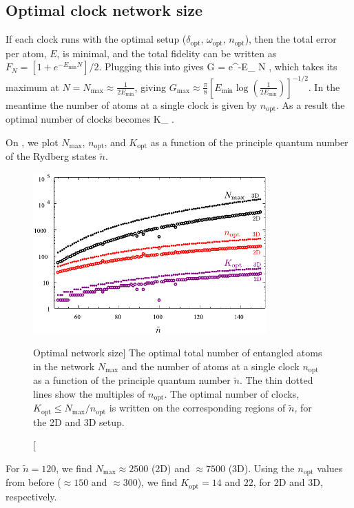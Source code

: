 \subsection{Optimal clock network size}
If each clock runs with the optimal setup ($\delta_\mathrm{opt},\,
\omega_\mathrm{opt},\, n_\mathrm{opt}$), then the total error per atom, $E$, is
minimal, and the total fidelity can be written as $F_N =
\left[1+e^{-E_\mathrm{min}N}\right]/2$. Plugging this into  gives
\bel
	G = e^{-E_ N} ,
\eel 
which takes its maximum at $N = N_\mathrm{max} \approx \frac{1}{2E_\mathrm{min}}$,
giving $G_\mathrm{max} \approx \frac{\pi}{8}
\left[E_\mathrm{min}\log\left(\frac{1}{2E_\mathrm{min}}\right)\right]^{-1/2}$.
In the meantime the number of atoms at a single clock is given by $ n_\mathrm{opt}$.
As a result the optimal number of clocks becomes 
\bel
	K_ \leq {} \approx
	.
\eel

On , we plot $N_{\mathrm{max}}$, $n_\mathrm{opt}$, and
$K_\mathrm{opt}$ as a function of the principle quantum number of the
Rydberg states $\tilde n$.
\begin{figure}[h]
\centering
\includegraphics[width=0.8\textwidth]{./figs_Komar2015/NnK_2d3d.pdf}
\caption
[Optimal network size]
{
\label{fig:K}
The optimal total number of entangled atoms in the network $N_\mathrm{max}$ and
the number of atoms at a single clock $n_\mathrm{opt}$ as a function of the principle quantum
number $\tilde n$. The thin dotted lines show the
multiples of $n_\mathrm{opt}$. The optimal number of clocks,
$K_\mathrm{opt} \leq N_\mathrm{max}/n_\mathrm{opt}$ is written on the corresponding
regions of $\tilde n$, for the 2D and 3D setup.}
\end{figure}
For $\tilde n = 120$, we find $N_\mathrm{max} \approx 2500$ (2D) and $\approx
7500$ (3D). Using the $n_\mathrm{opt}$ values from before ($\approx 150$ and
$\approx 300$), we find $K_\mathrm{opt} = 14$ and $22$, for 2D and 3D,
respectively.

